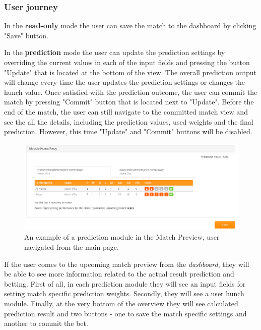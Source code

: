 \subsubsection*{User journey}
\label{subsec:upcomingmatchviewuserjourney}
In the \textbf{read-only} mode the user can save the match to the dashboard by clicking "Save" button. 

In the \textbf{prediction} mode the user can update the prediction settings by overriding the current values in each of the input fields and pressing the button "Update" that is located at the bottom of the view. The overall prediction output will change every time the user updates the prediction settings or changes the hunch value. Once satisfied with the prediction outcome, the user can commit the match by pressing "Commit" button that is located next to "Update". Before the end of the match, the user can still navigate to the committed match view and see the all the details, including the prediction values, used weights and the final prediction. However, this time "Update" and "Commit" buttons will be disabled.

\begin{figure}[H]
	\begin{center}
		\includegraphics[width=.90\linewidth,natwidth=610,natheight=642]{impl/images/matchoverviewex_from_main_page}
		\caption{An example of a prediction module in the Match Preview, user navigated from the main page.} \label{fig:using: matchoverviewex_from_main_page}
	\end{center}
\end{figure}

If the user comes to the upcoming match preview from the \emph{dashboard}, they will be able to see more information related to the actual result prediction and betting.
First of all, in each prediction module they will see an input fields for setting match specific prediction weights. Secondly, they will see a user hunch module. Finally, at the very bottom of the overview they will see calculated prediction result and two buttons - one to save the match specific settings and another to commit the bet.


